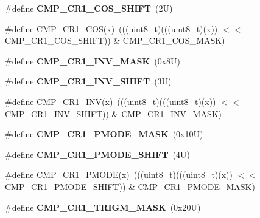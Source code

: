 \begin{DoxyCompactItemize}
\#define {\bfseries C\+M\+P\+\_\+\+C\+R1\+\_\+\+C\+O\+S\+\_\+\+S\+H\+I\+FT}~(2\+U)
\item 
\#define \mbox{\hyperlink{group___c_m_p___register___masks_ga7b21f24c4a39952ce03371054c09fd6e}{C\+M\+P\+\_\+\+C\+R1\+\_\+\+C\+OS}}(x)~(((uint8\+\_\+t)(((uint8\+\_\+t)(x)) $<$$<$ C\+M\+P\+\_\+\+C\+R1\+\_\+\+C\+O\+S\+\_\+\+S\+H\+I\+FT)) \& C\+M\+P\+\_\+\+C\+R1\+\_\+\+C\+O\+S\+\_\+\+M\+A\+SK)
\item 
\mbox{\label{group___c_m_p___register___masks_ga562c151a4679c2b50e20d6418dcc7d99}} 
\#define {\bfseries C\+M\+P\+\_\+\+C\+R1\+\_\+\+I\+N\+V\+\_\+\+M\+A\+SK}~(0x8\+U)
\item 
\mbox{\label{group___c_m_p___register___masks_gae8bcf6f11eb6afb3967dc6e318b0c41f}} 
\#define {\bfseries C\+M\+P\+\_\+\+C\+R1\+\_\+\+I\+N\+V\+\_\+\+S\+H\+I\+FT}~(3\+U)
\item 
\#define \mbox{\hyperlink{group___c_m_p___register___masks_ga773bf2a2c66a8a3658045c17a09c6b25}{C\+M\+P\+\_\+\+C\+R1\+\_\+\+I\+NV}}(x)~(((uint8\+\_\+t)(((uint8\+\_\+t)(x)) $<$$<$ C\+M\+P\+\_\+\+C\+R1\+\_\+\+I\+N\+V\+\_\+\+S\+H\+I\+FT)) \& C\+M\+P\+\_\+\+C\+R1\+\_\+\+I\+N\+V\+\_\+\+M\+A\+SK)
\item 
\mbox{\label{group___c_m_p___register___masks_ga09a2757123048a40e1694dd9454982ee}} 
\#define {\bfseries C\+M\+P\+\_\+\+C\+R1\+\_\+\+P\+M\+O\+D\+E\+\_\+\+M\+A\+SK}~(0x10\+U)
\item 
\mbox{\label{group___c_m_p___register___masks_ga35cfe45cce5ed6925e522e3c4527054a}} 
\#define {\bfseries C\+M\+P\+\_\+\+C\+R1\+\_\+\+P\+M\+O\+D\+E\+\_\+\+S\+H\+I\+FT}~(4\+U)
\item 
\#define \mbox{\hyperlink{group___c_m_p___register___masks_gab32908b6aa407efc6cf10f244832a078}{C\+M\+P\+\_\+\+C\+R1\+\_\+\+P\+M\+O\+DE}}(x)~(((uint8\+\_\+t)(((uint8\+\_\+t)(x)) $<$$<$ C\+M\+P\+\_\+\+C\+R1\+\_\+\+P\+M\+O\+D\+E\+\_\+\+S\+H\+I\+FT)) \& C\+M\+P\+\_\+\+C\+R1\+\_\+\+P\+M\+O\+D\+E\+\_\+\+M\+A\+SK)
\item 
\mbox{\label{group___c_m_p___register___masks_ga24b34c51bad9a20f0b0d47b89fdd864b}} 
\#define {\bfseries C\+M\+P\+\_\+\+C\+R1\+\_\+\+T\+R\+I\+G\+M\+\_\+\+M\+A\+SK}~(0x20\+U)
$$
\end{DoxyCompactItemize}
